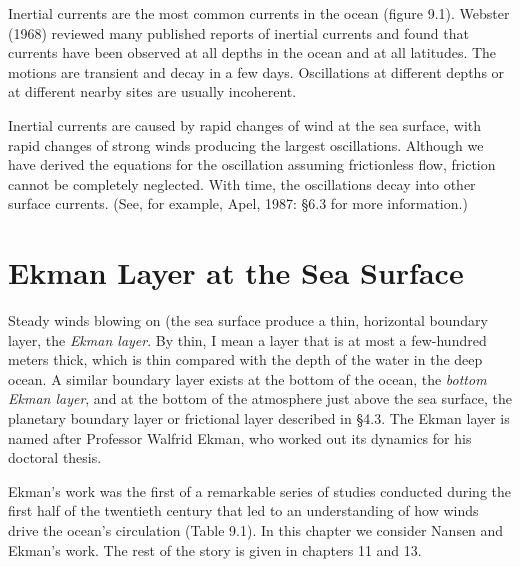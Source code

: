 Inertial currents are the most common currents in the ocean (figure
9.1). Webster (1968) reviewed many published reports of inertial
currents and found that currents have been
observed at all depths in the ocean and at all latitudes. The motions
are transient and decay in a few days. Oscillations at different
depths or at different nearby sites are usually incoherent.

Inertial currents are caused by rapid changes of wind at the sea
surface, with rapid changes of strong winds producing the largest
oscillations. Although we have derived the equations for the
oscillation assuming frictionless flow, friction cannot be completely
neglected. With time, the oscillations decay into other surface
currents. (See, for example, Apel, 1987: \S6.3 for more information.)

\section{Ekman Layer at the Sea Surface}
Steady winds blowing on (the sea surface produce a thin, horizontal boundary
layer, the \textit{Ekman layer}.  By
thin, I mean a layer that is at most a few-hundred meters thick, which
is thin compared with the depth of the water in the deep ocean. A
similar boundary layer exists at the bottom of the ocean, the
\textit{bottom Ekman layer}, and at
the bottom of the atmosphere just above the sea surface, the planetary
boundary layer or frictional layer described in \S 4.3. The Ekman
layer is named after Professor Walfrid Ekman, who worked out its
dynamics for his doctoral thesis.

Ekman's work was the first of a remarkable series of studies conducted
during the first half of the twentieth century that led to an
understanding of how winds drive the ocean's circulation (Table
9.1). In this chapter we consider Nansen and Ekman's work. The rest of
the story is given in chapters 11 and 13.

